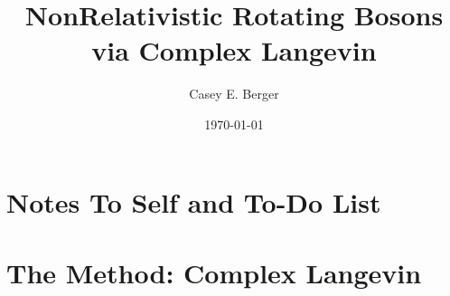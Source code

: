 \documentclass[onecolumn, 12pt]{report}
\title{NonRelativistic Rotating Bosons via Complex Langevin}
\author{Casey E. Berger}
\date{\today}
\begin{document}
\begin{titlepage}
\maketitle
\end{titlepage}
\tableofcontents

\chapter{Notes To Self and To-Do List}


%


\chapter{The Method: Complex Langevin}


%

%

\end{document}
